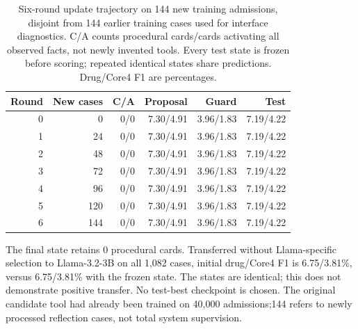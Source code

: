 \begin{table}[t]\centering\small
\setlength{\tabcolsep}{4pt}
\caption{Six-round update trajectory on 144 new training admissions, disjoint from 144 earlier training cases used for interface diagnostics. C/A counts procedural cards/cards activating all observed facts, not newly invented tools. Every test state is frozen before scoring; repeated identical states share predictions. Drug/Core4 F1 are percentages.}
\label{tab:local-rounds}
\begin{tabular}{@{}rrrrrr@{}}\toprule
Round & New cases & C/A & Proposal & Guard & Test\\\midrule
0 & 0 & 0/0 & 7.30/4.91 & 3.96/1.83 & 7.19/4.22\\
1 & 24 & 0/0 & 7.30/4.91 & 3.96/1.83 & 7.19/4.22\\
2 & 48 & 0/0 & 7.30/4.91 & 3.96/1.83 & 7.19/4.22\\
3 & 72 & 0/0 & 7.30/4.91 & 3.96/1.83 & 7.19/4.22\\
4 & 96 & 0/0 & 7.30/4.91 & 3.96/1.83 & 7.19/4.22\\
5 & 120 & 0/0 & 7.30/4.91 & 3.96/1.83 & 7.19/4.22\\
6 & 144 & 0/0 & 7.30/4.91 & 3.96/1.83 & 7.19/4.22\\
\bottomrule\end{tabular}
\end{table}The final state retains 0 procedural cards. Transferred without Llama-specific selection to Llama-3.2-3B on all 1,082 cases, initial drug/Core4 F1 is 6.75/3.81\%, versus 6.75/3.81\% with the frozen state. The states are identical; this does not demonstrate positive transfer.
No test-best checkpoint is chosen. The original candidate tool had already been trained on 40,000 admissions;144 refers to newly processed reflection cases, not total system supervision.

